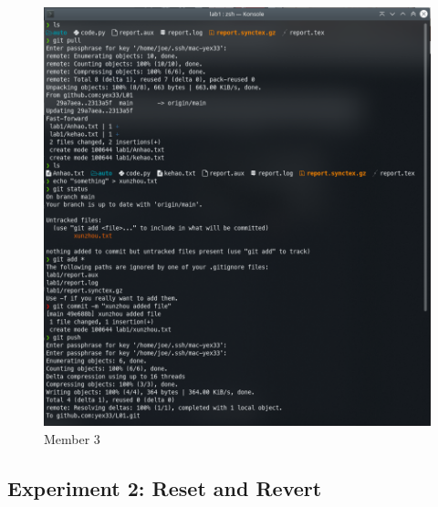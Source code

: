 \documentclass[titlepage, 12pt]{article}
\begin{document}
\begin{figure}[h]
  \includegraphics[width=\textwidth]{e1m3}
  \caption{Member 3}
\end{figure}

\newpage{}

\subsection{Experiment 2: Reset and Revert}
\end{document}
